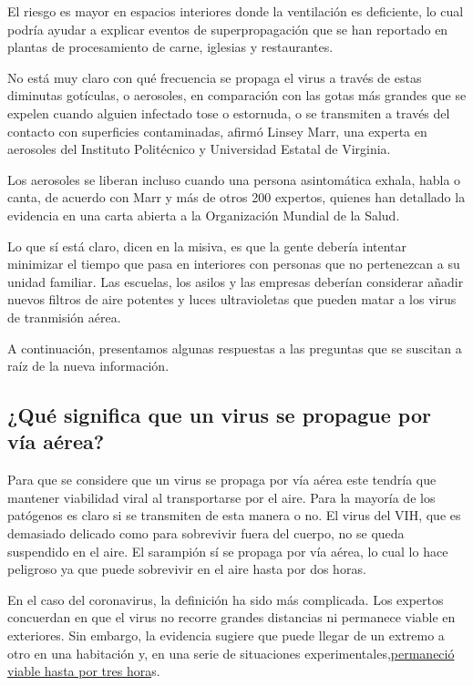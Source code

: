 El riesgo es mayor en espacios interiores donde la ventilación es
deficiente, lo cual podría ayudar a explicar eventos de superpropagación
que se han reportado en plantas de procesamiento de carne, iglesias y
restaurantes.

No está muy claro con qué frecuencia se propaga el virus a través de
estas diminutas gotículas, o aerosoles, en comparación con las gotas más
grandes que se expelen cuando alguien infectado tose o estornuda, o se
transmiten a través del contacto con superficies contaminadas, afirmó
Linsey Marr, una experta en aerosoles del Instituto Politécnico y
Universidad Estatal de Virginia.

Los aerosoles se liberan incluso cuando una persona asintomática exhala,
habla o canta, de acuerdo con Marr y más de otros 200 expertos, quienes
han detallado la evidencia en una carta abierta a la Organización
Mundial de la Salud.

Lo que sí está claro, dicen en la misiva, es que la gente debería
intentar minimizar el tiempo que pasa en interiores con personas que no
pertenezcan a su unidad familiar. Las escuelas, los asilos y las
empresas deberían considerar añadir nuevos filtros de aire potentes y
luces ultravioletas que pueden matar a los virus de tranmisión aérea.

A continuación, presentamos algunas respuestas a las preguntas que se
suscitan a raíz de la nueva información.

\hypertarget{quuxe9-significa-que-un-virus-se-propague-por-vuxeda-auxe9rea}{%
\subsection{¿Qué significa que un virus se propague por vía
aérea?}\label{quuxe9-significa-que-un-virus-se-propague-por-vuxeda-auxe9rea}}

Para que se considere que un virus se propaga por vía aérea este tendría
que mantener viabilidad viral al transportarse por el aire. Para la
mayoría de los patógenos es claro si se transmiten de esta manera o no.
El virus del VIH, que es demasiado delicado como para sobrevivir fuera
del cuerpo, no se queda suspendido en el aire. El sarampión sí se
propaga por vía aérea, lo cual lo hace peligroso ya que puede sobrevivir
en el aire hasta por dos horas.

En el caso del coronavirus, la definición ha sido más complicada. Los
expertos concuerdan en que el virus no recorre grandes distancias ni
permanece viable en exteriores. Sin embargo, la evidencia sugiere que
puede llegar de un extremo a otro en una habitación y, en una serie de
situaciones
experimentales,\href{https://www.nytimes3xbfgragh.onion/es/2020/03/25/espanol/coronavirus-aire-como-se-transmite.html}{permaneció
viable hasta por tres hora}s.

